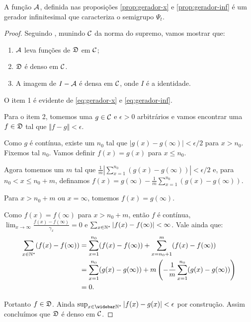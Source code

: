 \begin{teorema}
  A função ${\mathcal{A}}$, definida nas proposições \ref{prop:gerador-x} e
  \ref{prop:gerador-inf} é um gerador infinitesimal que caracteriza
  o semigrupo $\Psi_t$.
\end{teorema}
\begin{proof}
  Seguindo \cite{liggett:85}, munindo ${\mathcal{C}}$ da norma do supremo, vamos
  mostrar que:
  \begin{enumerate}
  \item ${\mathcal{A}}$ leva funções de ${\mathfrak{D}}$ em ${\mathcal{C}}$;
  \item ${\mathfrak{D}}$ é denso em ${\mathcal{C}}$.
  \item A imagem de $I - {\mathcal{A}}$ é densa em ${\mathcal{C}}$, onde $I$ é a identidade.
  \end{enumerate}

  O item 1 é evidente de \eqref{eq:gerador-x} e
  \eqref{eq:gerador-inf}.

  Para o item 2, tomemos uma $g \in {\mathcal{C}}$ e $\epsilon > 0$ arbitrários e
  vamos encontrar uma $f \in {\mathfrak{D}}$ tal que $\Vert f - g \Vert <
  \epsilon$.

  Como $g$ é contínua, existe um $n_0$ tal que $|g(x) - g(\infty)| <
  \epsilon/2$ para $x > n_0$. Fixemos tal $n_0$. Vamos definir $f(x) =
  g(x)$ para $x \leq n_0$.

  Agora tomemos um $m$ tal que $ \frac{1}{m} |\sum_{x = 1}^{n_0} (g(x)
  - g(\infty))| < \epsilon/2$ e, para $n_0 < x \leq n_0 + m$,
  definamos $f(x) = g(\infty) -\frac{1}{m} \sum_{x = 1}^{n_0} (g(x) -
  g(\infty))$.

  Para $x > n_0 + m$ ou $x = \infty$, tomemos $f(x) = g(\infty)$.

  Como $f(x) = f(\infty)$ para $x > n_0 + m$, então $f$ é contínua,
  $\lim_{x \to \infty} \frac{f(x) - f(\infty)}{\gamma_x} = 0$ e 
  $\sum_{x \in {\mathbb{N^*}}} |f(x) - f(\infty)| < \infty$. Vale ainda que:
  \begin{align*}
    \sum_{x \in {\mathbb{N^*}}} (f(x) - f(\infty) )
    &= \sum_{x = 1}^{n_0} (f(x) - f(\infty)) + 
    \sum_{x = n_0 + 1}^m (f(x) - f(\infty)) \\
    &= \sum_{x = 1}^{n_0} (g(x) - g(\infty)) +
    m \left( - \frac{1}{m}  \sum_{x = 1}^{n_0} (g(x) - g(\infty))
    \right)\\
    &= 0.
  \end{align*}

  Portanto $f \in {\mathfrak{D}}$. Ainda $\sup_{x \in \Nzb} |f(x) - g(x)| <
  \epsilon$ por construção. Assim concluímos que ${\mathfrak{D}}$ é denso em
  ${\mathcal{C}}$.


\end{proof}

